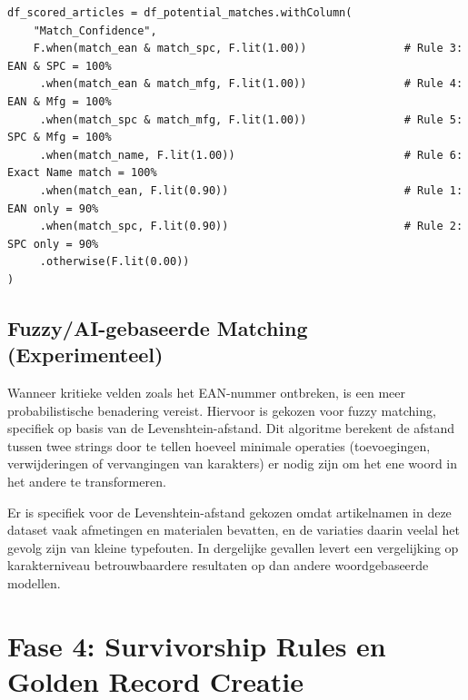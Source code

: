 \begin{listing}[h]
\begin{verbatim}
df_scored_articles = df_potential_matches.withColumn(
    "Match_Confidence",
    F.when(match_ean & match_spc, F.lit(1.00))               # Rule 3: EAN & SPC = 100%
     .when(match_ean & match_mfg, F.lit(1.00))               # Rule 4: EAN & Mfg = 100%
     .when(match_spc & match_mfg, F.lit(1.00))               # Rule 5: SPC & Mfg = 100%
     .when(match_name, F.lit(1.00))                          # Rule 6: Exact Name match = 100%
     .when(match_ean, F.lit(0.90))                           # Rule 1: EAN only = 90%
     .when(match_spc, F.lit(0.90))                           # Rule 2: SPC only = 90%
     .otherwise(F.lit(0.00))
)
 \end{verbatim}
\caption{Deterministische matching logica in PySpark.}
\label{lst:hard-matching}
\end{listing}

\subsection{Fuzzy/AI-gebaseerde Matching (Experimenteel)}

Wanneer kritieke velden zoals het EAN-nummer ontbreken, is een meer probabilistische benadering vereist. Hiervoor is gekozen voor fuzzy matching, specifiek op basis van de Levenshtein-afstand. Dit algoritme berekent de afstand tussen twee strings door te tellen hoeveel minimale operaties (toevoegingen, verwijderingen of vervangingen van karakters) er nodig zijn om het ene woord in het andere te transformeren.

Er is specifiek voor de Levenshtein-afstand gekozen omdat artikelnamen in deze dataset vaak afmetingen en materialen bevatten, en de variaties daarin veelal het gevolg zijn van kleine typefouten. In dergelijke gevallen levert een vergelijking op karakterniveau betrouwbaardere resultaten op dan andere woordgebaseerde modellen.

\section{Fase 4: Survivorship Rules en Golden Record Creatie}%
\label{sec:poc-survivorship}

